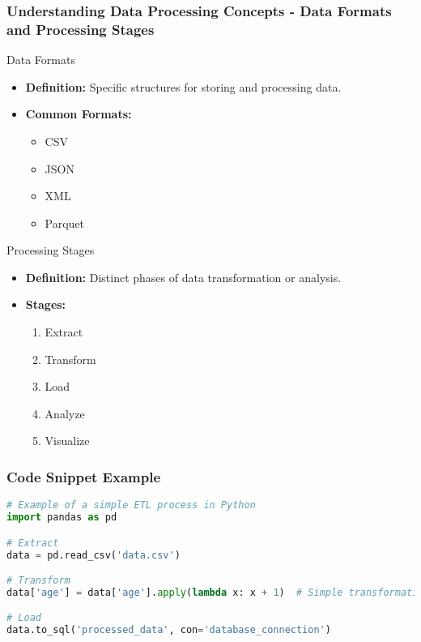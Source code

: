 \documentclass[aspectratio=169]{beamer}
\begin{document}
\begin{frame}[fragile]
    \frametitle{Understanding Data Processing Concepts - Data Formats and Processing Stages}
    \begin{block}{Data Formats}
        \begin{itemize}
            \item \textbf{Definition:} Specific structures for storing and processing data.
            \item \textbf{Common Formats:}
            \begin{itemize}
                \item CSV
                \item JSON
                \item XML
                \item Parquet
            \end{itemize}
        \end{itemize}
    \end{block}
    \begin{block}{Processing Stages}
        \begin{itemize}
            \item \textbf{Definition:} Distinct phases of data transformation or analysis.
            \item \textbf{Stages:}
            \begin{enumerate}
                \item Extract
                \item Transform
                \item Load
                \item Analyze
                \item Visualize
            \end{enumerate}
        \end{itemize}
    \end{block}
\end{frame}

\begin{frame}[fragile]
    \frametitle{Code Snippet Example}
    \begin{lstlisting}[language=Python]
# Example of a simple ETL process in Python
import pandas as pd

# Extract
data = pd.read_csv('data.csv')

# Transform
data['age'] = data['age'].apply(lambda x: x + 1)  # Simple transformation

# Load
data.to_sql('processed_data', con='database_connection')
    \end{lstlisting}
\end{frame}
\end{document}

